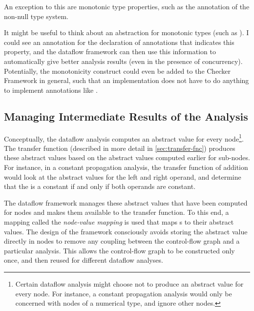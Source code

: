 An exception to this are monotonic type properties, such as the  annotation
of the non-null type system.

\begin{workinprogress}
    It might be useful to think about an abstraction for monotonic types (such as ).
    I could see an annotation for the declaration of annotations that indicates this property, and the
    dataflow framework can then use this information to automatically give better analysis results (even
    in the presence of concurrency).  Potentially, the monotonicity construct could even be added
    to the Checker Framework in general, such that an implementation does not have to do anything
    to implement annotations like .
\end{workinprogress}




\subsection{Managing Intermediate Results of the Analysis}
\label{sec:node-mapping}
\label{sec:store-management}

Conceptually, the dataflow analysis computes an abstract value for every node\footnote{Certain
dataflow analysis might choose not to produce an abstract value for every node.  For instance,
a constant propagation analysis would only be concerned with nodes of a numerical type, and
ignore other nodes.}.
The transfer function (described in more detail in \autoref{sec:transfer-fnc}) produces these abstract
values based on the abstract values computed earlier for sub-nodes.
For instance, in a constant propagation analysis, the transfer function of addition would look at
the abstract values for the left and right operand, and determine that the 
is a constant if and only if both operands are constant.

The dataflow framework manages these abstract values that have been computed for nodes and
makes them available to the transfer function.  To this end, a mapping called the
\emph{node-value mapping} is used that maps s to their abstract values.
The design of the framework consciously avoids storing the abstract value directly in
nodes to remove any coupling between the control-flow graph and a particular analysis.
This allows the control-flow graph to be constructed only once, and then reused for different
dataflow analyses.

